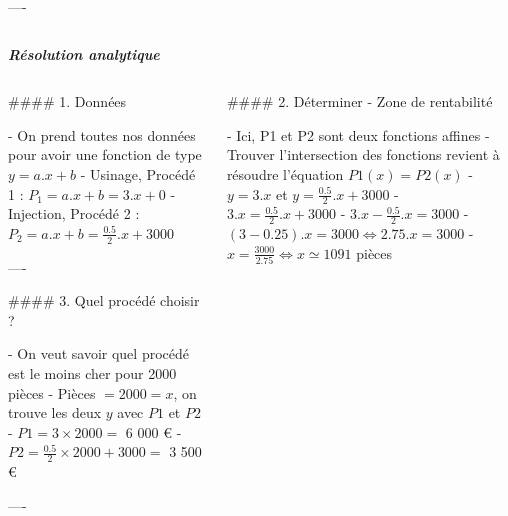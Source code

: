 \documentclass{beamer}
\begin{document}
\begin{frame}[fragile]
\begin{columns}
\begin{column}{.4\textwidth}
\begin{markdown}
----
\end{markdown}


\end{column}

\end{columns}

\bigskip

\textbf{\textit{Résolution analytique}}

\bigskip
    
\begin{columns}[T]

\begin{column}{.46\textwidth}

\begin{markdown}

#### 1. Données 

- On prend toutes nos données pour avoir une fonction de type $y=a.x+b$
- Usinage, Procédé 1 :  $P_1= a. x + b = 3.x + 0$
- Injection, Procédé 2 :  $P_2= a. x + b = \frac{0.5}{2}.x + 3000$

----


#### 3. Quel procédé choisir ?

- On veut savoir quel procédé est le moins cher pour 2000 pièces
- Pièces $=2000 = x $, on trouve les deux $y$ avec $P1$ et $P2$
- $P1=3 \times 2000 =$ 6 000 \euro
- $P2=\frac{0.5}{2} \times 2000 + 3000 =$ 3 500 \euro





----


\end{markdown}



\end{column}









\begin{column}{.46\textwidth}

\begin{markdown}

#### 2. Déterminer - Zone de rentabilité

- Ici, P1 et P2 sont deux fonctions affines 
- Trouver l'intersection des fonctions revient à résoudre l'équation $P1(x) = P2(x)$
- $y=3.x$ et $y=\frac{0.5}{2}.x+3000$
- $3.x=\frac{0.5}{2}.x+3000$
- $3.x-\frac{0.5}{2}.x=3000$
- $(3-0.25).x = 3000 \Leftrightarrow 2.75.x =3000$
- $x=\frac{3000}{2.75} \Leftrightarrow x \simeq 1091$ pièces




\end{markdown}
\end{column}
\end{columns}
\end{frame}
\end{document}
